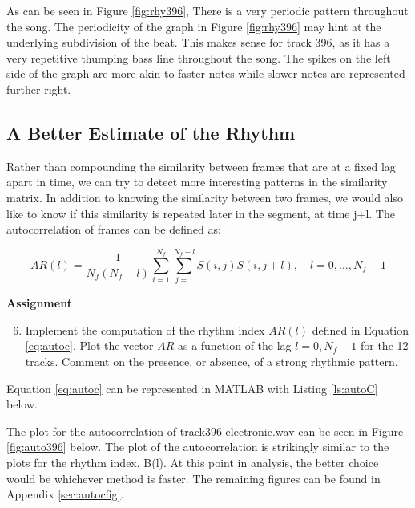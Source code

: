 \documentclass{article} %
\begin{document}
As can be seen in Figure \ref{fig:rhy396}, There is a very periodic pattern throughout the song. The periodicity of the graph in Figure \ref{fig:rhy396} may hint
at the underlying subdivision of the beat. This makes sense for track 396, as it has a very repetitive thumping bass line throughout the song. The spikes on the left
side of the graph are more akin to faster notes while slower notes are represented further right. 

\subsection{A Better Estimate of the Rhythm}
Rather than compounding the similarity between frames that are at a fixed lag apart in time, we can try to detect more interesting patterns in the similarity matrix. 
In addition to knowing the similarity between two frames, we would also like to know if this similarity is repeated later in the segment, at time j+l. 
The autocorrelation of frames can be defined as:

\begin{equation}
\label{eq:autoc}
AR(l)= \frac{1}{N_f(N_f-l)} \sum\limits_{i=1}^{N_f}  \sum\limits_{j=1}^{N_f-l} S(i,j)S(i,j+l), \quad l=0,\dots,N_f-1
\end{equation}

\begin{framed}
\textbf{Assignment}
\begin{enumerate}
\setcounter{enumi}{5}
\item Implement the computation of the rhythm index $AR(l)$ defined in Equation \ref{eq:autoc}. Plot the vector $AR$ as a function of the lag $l=0,N_f-1$ for the 12 tracks.
Comment on the presence, or absence, of a strong rhythmic pattern.
\end{enumerate}
\end{framed}

Equation \ref{eq:autoc} can be represented in MATLAB with Listing  \ref{ls:autoC} below. 

 

The plot for the autocorrelation of track396-electronic.wav can be seen in Figure \ref{fig:auto396} below. The plot of the autocorrelation is strikingly similar to the plots for the 
rhythm index, B(l). At this point in analysis, the better choice would be whichever method is faster. 
The remaining figures can be found in Appendix \ref{sec:autocfig}. 
\end{document}
